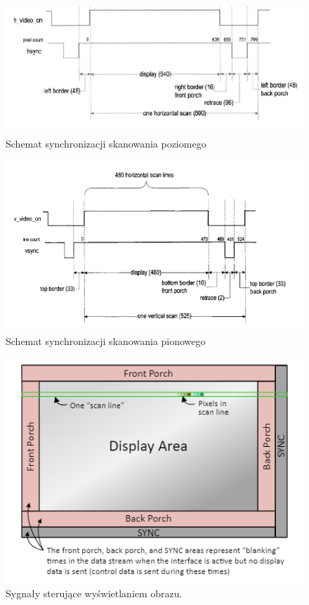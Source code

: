 \documentclass[12pt, a4paper]{article}
\begin{document}
\begin{figure}[H]
    \centering
    \includegraphics[scale=0.9]{images/horizontal_scan_lines.png}
     \caption{Schemat synchronizacji skanowania poziomego}
\end{figure}

\begin{figure}[H]
    \centering
    \includegraphics[scale=0.85]{images/vertical_scan_line.png}
     \caption{Schemat synchronizacji skanowania pionowego}
\end{figure}

\begin{figure}[H]
    \centering
    \includegraphics[scale=1.3]{images/display_control_signals.png}
     \caption{Sygnały sterujące wyświetlaniem obrazu.}
\end{figure}
\end{document}
